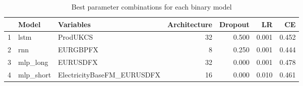 \begin{table}[ht]
\centering
\begin{tabular}{rllrrrr}
  \hline
 & Model & Variables & Architecture & Dropout & LR & CE \\ 
  \hline
1 & lstm & ProdUKCS &   32 & 0.500 & 0.001 & 0.452 \\ 
  2 & rnn & EURGBPFX &    8 & 0.250 & 0.001 & 0.444 \\ 
  3 & mlp\_long & EURUSDFX &   32 & 0.000 & 0.001 & 0.478 \\ 
  4 & mlp\_short & ElectricityBaseFM\_EURUSDFX &   16 & 0.000 & 0.010 & 0.461 \\ 
   \hline
\end{tabular}
\caption{Best parameter combinations for each binary model} 
\label{tab:best_models}
\end{table}
